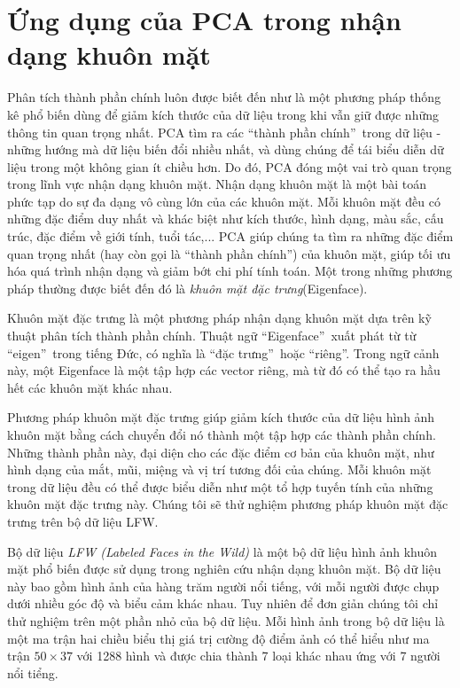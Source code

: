 \documentclass[12pt,a4paper,oneside]{report}
\numberwithin{equation}{section}
\begin{document}
\section{Ứng dụng của PCA trong nhận dạng khuôn mặt}
Phân tích thành phần chính luôn được biết đến như là một phương pháp thống kê phổ biến dùng để giảm kích thước của dữ liệu trong khi vẫn giữ được những thông tin quan trọng nhất. PCA tìm ra các \textquotedblleft thành phần chính\textquotedblright\  trong dữ liệu - những hướng mà dữ liệu biến đổi nhiều nhất, và dùng chúng để tái biểu diễn dữ liệu trong một không gian ít chiều hơn. Do đó, PCA đóng một vai trò quan trọng trong lĩnh vực nhận dạng khuôn mặt. Nhận dạng khuôn mặt là một bài toán phức tạp do sự đa dạng vô cùng lớn của các khuôn mặt. Mỗi khuôn mặt đều có những đặc điểm duy nhất và khác biệt như kích thước, hình dạng, màu sắc, cấu trúc, đặc điểm về giới tính, tuổi tác,... PCA giúp chúng ta tìm ra những đặc điểm quan trọng nhất (hay còn gọi là \textquotedblleft thành phần chính\textquotedblright) của khuôn mặt, giúp tối ưu hóa quá trình nhận dạng và giảm bớt chi phí tính toán. Một trong những phương pháp thường được biết đến đó là \textit{khuôn mặt đặc trưng}(Eigenface).

Khuôn mặt đặc trưng là một phương pháp nhận dạng khuôn mặt dựa trên kỹ thuật phân tích thành phần chính. Thuật ngữ \textquotedblleft Eigenface\textquotedblright\ xuất phát từ từ \textquotedblleft eigen\textquotedblright\ trong tiếng Đức, có nghĩa là \textquotedblleft đặc trưng\textquotedblright\ hoặc  \textquotedblleft riêng\textquotedblright. Trong ngữ cảnh này, một Eigenface là một tập hợp các vector riêng, mà từ đó có thể tạo ra hầu hết các khuôn mặt khác nhau.

Phương pháp khuôn mặt đặc trưng giúp giảm kích thước của dữ liệu hình ảnh khuôn mặt bằng cách chuyển đổi nó thành một tập hợp các thành phần chính. Những thành phần này, đại diện cho các đặc điểm cơ bản của khuôn mặt, như hình dạng của mắt, mũi, miệng và vị trí tương đối của chúng. Mỗi khuôn mặt trong dữ liệu đều có thể được biểu diễn như một tổ hợp tuyến tính của những khuôn mặt đặc trưng này. Chúng tôi sẽ thử nghiệm phương pháp  khuôn mặt đặc trưng trên bộ dữ liệu LFW.

Bộ dữ liệu \textit{LFW (Labeled Faces in the Wild)} \cite{huang} là một bộ dữ liệu hình ảnh khuôn mặt phổ biến được sử dụng trong nghiên cứu nhận dạng khuôn mặt. Bộ dữ liệu này bao gồm hình ảnh của hàng trăm người nổi tiếng, với mỗi người được chụp dưới nhiều góc độ và biểu cảm khác nhau. Tuy nhiên để đơn giản chúng tôi chỉ thử nghiệm trên một phần nhỏ của bộ dữ liệu. Mỗi hình ảnh trong bộ dữ liệu là một ma trận hai chiều biểu thị giá trị cường độ điểm ảnh có thể hiểu như ma trận $50\times37$ với 1288 hình và được chia thành 7 loại khác nhau ứng với 7 người nổi tiểng.
\end{document}
